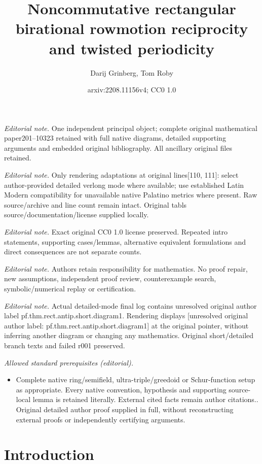 \documentclass[numbers=enddot,12pt,final,onecolumn,notitlepage]{scrartcl}%
\title{Noncommutative rectangular birational rowmotion reciprocity and twisted periodicity}
\author{Darij Grinberg, Tom Roby}
\date{arxiv:2208.11156v4; CC0 1.0}
\theoremstyle{definition}
\begin{document}
\maketitle
\noindent\textit{Editorial note.} One independent principal object; complete original mathematical paper201--10323 retained with full native diagrams, detailed supporting arguments and embedded original bibliography. All ancillary original files retained.\par\medskip
\noindent\textit{Editorial note.} Only rendering adaptations at original lines[110, 111]: select author-provided detailed verlong mode where available; use established Latin Modern compatibility for unavailable native Palatino metrics where present. Raw source/archive and line count remain intact. Original tabls source/documentation/license supplied locally.\par\medskip
\noindent\textit{Editorial note.} Exact original CC0 1.0 license preserved. Repeated intro statements, supporting cases/lemmas, alternative equivalent formulations and direct consequences are not separate counts.\par\medskip
\noindent\textit{Editorial note.} Authors retain responsibility for mathematics. No proof repair, new assumptions, independent proof review, counterexample search, symbolic/numerical replay or certification.\par\medskip
\noindent\textit{Editorial note.} Actual detailed-mode final log contains unresolved original author label pf.thm.rect.antip.short.diagram1. Rendering displays [unresolved original author label: pf.thm.rect.antip.short.diagram1] at the original pointer, without inferring another diagram or changing any mathematics. Original short/detailed branch texts and failed r001 preserved.\par\medskip
\noindent\textit{Allowed standard prerequisites (editorial).}\begin{itemize}
\item Complete native ring/semifield, ultra-triple/greedoid or Schur-function setup as appropriate. Every native convention, hypothesis and supporting source-local lemma is retained literally. External cited facts remain author citations.. Original detailed author proof supplied in full, without reconstructing external proofs or independently certifying arguments.
\end{itemize}\medskip
\section*{Introduction}
\end{document}
